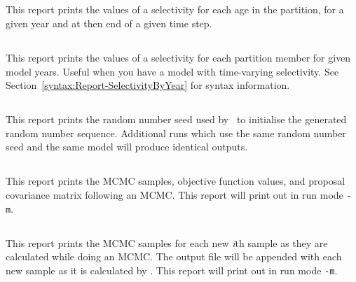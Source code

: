 \subsection{}\label{sec:Report-Selectivity}

This report prints the values of a selectivity for each age in the partition, for a given year and at then end of a given time step.

\subsection{}\label{sec:Report-SelectivityByYear}

This report prints the values of a selectivity for each partition member for given model years. Useful when you have a model with time-varying selectivity. See Section~\ref{syntax:Report-SelectivityByYear} for syntax information.


\subsection{}\label{sec:Report-RandomNumberSeed}

This report prints the random number seed used by \CNAME\ to initialise the generated random number sequence. Additional runs which use the same random number seed and the same model will produce identical outputs.

\subsection{}\label{sec:Report-MCMC}

This report prints the MCMC samples, objective function values, and proposal covariance matrix following an MCMC. This report will print out in run mode \texttt{-m}.

\subsection{}\label{sec:Report-MCMCSample}

This report prints the MCMC samples for each new \textit{i}th sample as they are calculated while doing an MCMC. The output file will be appended with each new sample as it is calculated by \CNAME. This report will print out in run mode \texttt{-m}.

